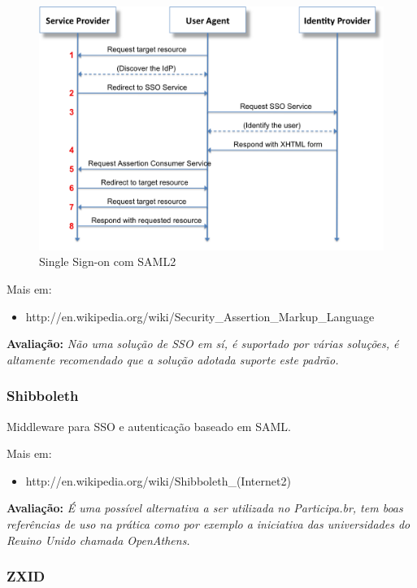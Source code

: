 \documentclass[11pt]{article}
\begin{document}
\begin{figure}[h]
\center
\includegraphics[scale=0.5]{saml2.png}
\caption{Single Sign-on com SAML2}
\label{fig:saml2}
\end{figure}

Mais em:
\begin{itemize}
  \item{http://en.wikipedia.org/wiki/Security\_Assertion\_Markup\_Language}
\end{itemize}

{\bf Avaliação:} {\it Não uma solução de SSO em sí, é suportado por várias
soluções, é altamente recomendado que a solução adotada suporte este padrão.}

\subsubsection{Shibboleth}

Middleware para SSO e autenticação baseado em SAML.

Mais em:
\begin{itemize}
  \item{http://en.wikipedia.org/wiki/Shibboleth\_(Internet2)}
\end{itemize}

{\bf Avaliação:} {\it É uma possível alternativa a ser utilizada no
Participa.br, tem boas referências de uso na prática como por exemplo a
iniciativa das universidades do Reuino Unido chamada OpenAthens.}

\subsubsection{ZXID}
\end{document}
